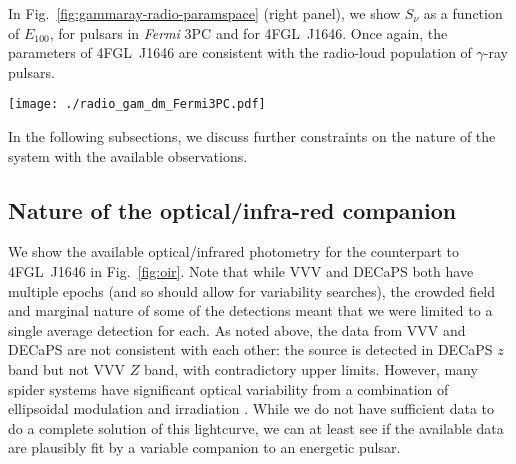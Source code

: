 \documentclass[fleqn,usenatbib]{mnras}
\newcommand{\fermi}{\textit{Fermi}}
\newcommand{\blinky}{{4FGL}~J1646}
\begin{document}
In Fig.~\ref{fig:gammaray-radio-paramspace} (right panel), we show $S_\nu$ as a function of $E_{100}$, for pulsars in \fermi{} 3PC and for \blinky{}. Once again, the parameters of \blinky{} are consistent with the radio-loud population of $\gamma$-ray pulsars.


\begin{figure*}
    \centering
    \texttt{[image: ./radio\_gam\_dm\_Fermi3PC.pdf]}
    \caption{Radio and $\gamma$-ray emission properties from the {\fermi\ 3PC and for \blinky}. Left: Ratio of $E_{100}$ to $\nu S_\nu$ as a function of pulsar DM. Right: $S_\nu$ versus $E_{100}$. \blinky{} is marked with a red star in both panels. {The DM lower limit of $\sim74$\,pc\,cm$^{-3}$ for \blinky\ is derived from scattering properties derived from the NE2001 Galactic electron density model \citep{2002astro.ph..7156C}}, based on the estimated DM at which diffractive interstellar scintillation becomes undetectable in our observations. The location of \blinky{} in this parameter space is consistent with the \fermi{} $\gamma$-ray pulsar population.}
    \label{fig:gammaray-radio-paramspace}
\end{figure*}

In the following subsections, we discuss further constraints on the nature of the system with the available observations.


\subsection{Nature of the optical/infra-red companion}
\label{subsec:oir_nature}
We show the available optical/infrared photometry for the counterpart to \blinky{} in Fig.~\ref{fig:oir}.  Note that while VVV and DECaPS both have multiple epochs (and so should allow for variability searches), the crowded field and marginal nature of some of the detections meant that we were limited to a single average detection for each.  As noted above, the data from VVV and DECaPS are not consistent with each other: the source is detected in DECaPS $z$ band but not VVV $Z$ band, with contradictory upper limits.  However, many spider systems have significant optical variability from a combination of ellipsoidal modulation and irradiation \citep[e.g.,][]{2019ApJ...872...42S,2019ApJ...883..108D,2023MNRAS.520.2217M}.  While we do not have sufficient data to do a complete solution of this lightcurve, we can at least see if the available data are plausibly fit by a variable companion to an energetic pulsar.
\end{document}
